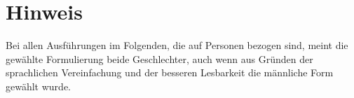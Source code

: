 \section*{Hinweis}

Bei allen Ausführungen im Folgenden, die auf Personen bezogen sind, meint die
gewählte Formulierung beide Geschlechter, auch wenn aus Gründen der
sprachlichen Vereinfachung und der besseren Lesbarkeit die männliche Form
gewählt wurde.
